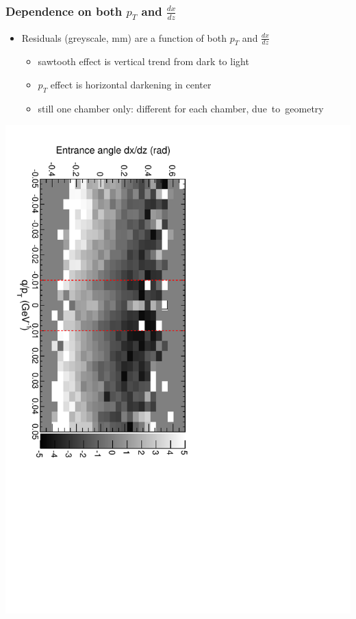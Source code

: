 \documentclass[compress]{beamer}
\begin{document}
\begin{frame}
\frametitle{Dependence on both $p_T$ and $\frac{dx}{dz}$}

\begin{itemize}
\item Residuals (greyscale, mm) are a function of both $p_T$ and $\frac{dx}{dz}$
\begin{itemize}\setlength{\itemsep}{0.1 cm}
\item sawtooth effect is vertical trend from dark to light
\item $p_T$ effect is horizontal darkening in center
\item still one chamber only: different for each chamber, \mbox{due to geometry\hspace{-1 cm}}
\end{itemize}

\end{itemize}

\includegraphics[height=\linewidth, angle=90]{sawtooth_qoverpt_complicated2.pdf}
\end{frame}
\end{document}
